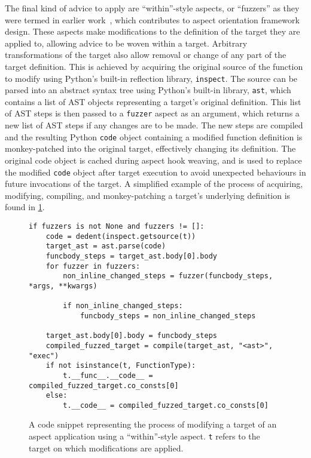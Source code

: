 The final kind of advice to apply are ``within''-style aspects, or ``fuzzers''
as they were termed in earlier work~\cite{wallis2018caise}, which \pdsf
contributes to aspect orientation framework design. These aspects make
modifications to the definition of the target they are applied to, allowing
advice to be woven within a target. Arbitrary transformations of the target also
allow removal or change of any part of the target definition. This is achieved
by acquiring the original source of the function to modify using Python's
built-in reflection library, \lstinline{inspect}. The source can be parsed into
an abstract syntax tree using Python's built-in library, \lstinline{ast}, which
contains a list of AST objects representing a target's original definition. This
list of AST steps is then passed to a \lstinline{fuzzer} aspect as an argument,
which returns a new list of AST steps if any changes are to be made. The new
steps are compiled and the resulting Python \lstinline{code} object containing a
modified function definition is monkey-patched into the original target,
effectively changing its definition. The original code object is cached during
aspect hook weaving, and is used to replace the modified \lstinline{code} object
after target execution to avoid unexpected behaviours in future invocations of
the target. A simplified example of the process of acquiring, modifying,
compiling, and monkey-patching a target's underlying definition is found in
\cref{fig:simplified_fuzzer_application_example}.

\begin{figure}
    \begin{lstlisting}
if fuzzers is not None and fuzzers != []:
    code = dedent(inspect.getsource(t))
    target_ast = ast.parse(code)
    funcbody_steps = target_ast.body[0].body
    for fuzzer in fuzzers:
        non_inline_changed_steps = fuzzer(funcbody_steps, *args, **kwargs)

        if non_inline_changed_steps:
            funcbody_steps = non_inline_changed_steps

    target_ast.body[0].body = funcbody_steps
    compiled_fuzzed_target = compile(target_ast, "<ast>", "exec")
    if not isinstance(t, FunctionType):
        t.__func__.__code__ =  compiled_fuzzed_target.co_consts[0]
    else:
        t.__code__ = compiled_fuzzed_target.co_consts[0]
    \end{lstlisting}
    \caption{A code snippet representing the process of modifying a target of an aspect application using a
    ``within''-style aspect. \lstinline{t} refers to the target on which
    modifications are applied.}
    \label{fig:simplified_fuzzer_application_example}
\end{figure}

